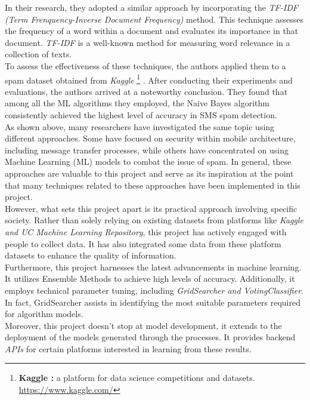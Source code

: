\documentclass[12pt,a4paper, oneside]{book}
\begin{document}
	In their research, they adopted a similar approach by incorporating the \textit{TF-IDF (Term Frenquency-Inverse Document Frequency)} method. This technique assesses the frequency of a word within a document and evaluates its importance in that document. \textit{TF-IDF} is a well-known method for measuring word relevance in a collection of texts.\\
	
	To assess the effectiveness of these techniques, the authors applied them to a spam dataset obtained from \textit{Kaggle} 
	\footnote{ \textbf{Kaggle :} a platform for data science competitions and datasets. \url{https://www.kaggle.com/}}
	. After conducting their experiments and evaluations, the authors arrived at a noteworthy conclusion. They found that among all the ML algorithms they employed, the Naive Bayes algorithm consistently achieved the highest level of accuracy in SMS spam detection.\\
	
	As shown above, many researchers have investigated the same topic using different approaches. Some have focused on security within mobile architecture, including message transfer processes, while others have concentrated on using Machine Learning (ML) models to combat the issue of spam. In general, these approaches are valuable to this project and serve as its inspiration at the point that many techniques related to these approaches have been implemented in this project.\\

    However, what sets this project apart is its practical approach involving specific society. Rather than solely relying on existing datasets from platforms like \textit{Kaggle and UC Machine Learning Repository}, this project has actively engaged with people to collect data. It has also integrated some data from these platform datasets to enhance the quality of information. \\
        
    Furthermore, this project harnesses the latest advancements in machine learning. It utilizes Ensemble Methods to achieve high levels of accuracy. Additionally, it employs technical parameter tuning, including \textit{GridSearcher and VotingClassifier}. In fact, GridSearcher assists in identifying the most suitable parameters required for algorithm models. \\
    
    Moreover, this project doesn't stop at model development, it extends to the deployment of the models generated through the processes. It provides backend \textit{APIs} for certain platforms interested in learning from these results. \\
    
\end{document}
